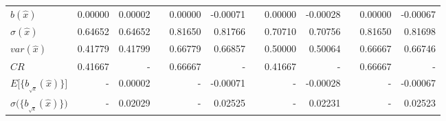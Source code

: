 \documentclass[report,12pt]{report}
\begin{document}
\begin{table}[H]
{\begin{tabular}{lrrlrrlrrlrr}
\multicolumn{1}{|l|}{$b(\hat x)$}                                    & \multicolumn{1}{r|}{0.00000} & \multicolumn{1}{r|}{0.00002} & \multicolumn{1}{l|}{} & \multicolumn{1}{r|}{0.00000}  & \multicolumn{1}{r|}{-0.00071} & \multicolumn{1}{l|}{} & \multicolumn{1}{r|}{0.00000} & \multicolumn{1}{r|}{-0.00028} & \multicolumn{1}{l|}{} & \multicolumn{1}{r|}{0.00000}  & \multicolumn{1}{r|}{-0.00067} \\
\multicolumn{1}{|l|}{$\sigma(\hat x)$}                               & \multicolumn{1}{r|}{0.64652} & \multicolumn{1}{r|}{0.64652} & \multicolumn{1}{l|}{} & \multicolumn{1}{r|}{0.81650}  & \multicolumn{1}{r|}{0.81766}  & \multicolumn{1}{l|}{} & \multicolumn{1}{r|}{0.70710} & \multicolumn{1}{r|}{0.70756}  & \multicolumn{1}{l|}{} & \multicolumn{1}{r|}{0.81650}  & \multicolumn{1}{r|}{0.81698}  \\
\multicolumn{1}{|l|}{$var(\hat x)$}                                  & \multicolumn{1}{r|}{0.41779} & \multicolumn{1}{r|}{0.41799} & \multicolumn{1}{l|}{} & \multicolumn{1}{r|}{0.66779}  & \multicolumn{1}{r|}{0.66857}  & \multicolumn{1}{l|}{} & \multicolumn{1}{r|}{0.50000} & \multicolumn{1}{r|}{0.50064}  & \multicolumn{1}{l|}{} & \multicolumn{1}{r|}{0.66667}  & \multicolumn{1}{r|}{0.66746}  \\ \cline{1-3} \cline{5-6} \cline{8-9} \cline{11-12} 
\multicolumn{1}{|l|}{$CR$}                                           & \multicolumn{1}{r|}{0.41667} & \multicolumn{1}{r|}{-}       & \multicolumn{1}{l|}{} & \multicolumn{1}{r|}{0.66667}  & \multicolumn{1}{r|}{-}        & \multicolumn{1}{l|}{} & \multicolumn{1}{r|}{0.41667} & \multicolumn{1}{r|}{-}        & \multicolumn{1}{l|}{} & \multicolumn{1}{r|}{0.66667}  & \multicolumn{1}{r|}{-}        \\ \cline{1-3} \cline{5-6} \cline{8-9} \cline{11-12} 
\multicolumn{1}{|l|}{$E\big [\{b_{_{\sqrt{k}}}(\hat x)\}\big ]$}     & \multicolumn{1}{r|}{-}       & \multicolumn{1}{r|}{0.00002} & \multicolumn{1}{l|}{} & \multicolumn{1}{r|}{-}        & \multicolumn{1}{r|}{-0.00071} & \multicolumn{1}{l|}{} & \multicolumn{1}{r|}{-}       & \multicolumn{1}{r|}{-0.00028} & \multicolumn{1}{l|}{} & \multicolumn{1}{r|}{-}        & \multicolumn{1}{r|}{-0.00067} \\
\multicolumn{1}{|l|}{$\sigma \big(\{b_{_{\sqrt{k}}}(\hat x)\}\big)$} & \multicolumn{1}{r|}{-}       & \multicolumn{1}{r|}{0.02029} & \multicolumn{1}{l|}{} & \multicolumn{1}{r|}{-}        & \multicolumn{1}{r|}{0.02525}  & \multicolumn{1}{l|}{} & \multicolumn{1}{r|}{-}       & \multicolumn{1}{r|}{0.02231}  & \multicolumn{1}{l|}{} & \multicolumn{1}{r|}{-}        & \multicolumn{1}{r|}{0.02523}  \\ \cline{1-3} \cline{5-6} \cline{8-9} \cline{11-12} 

\end{tabular}}
\end{table}
\end{document}

